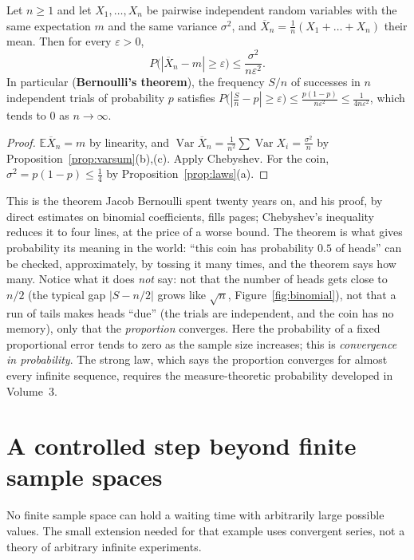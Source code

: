 \begin{theorem}\label{thm:wlln}
Let $n\ge1$ and let $X_1,\dots,X_n$ be pairwise independent random variables with the same expectation $m$ and the same variance $\sigma^2$, and $\overline X_n=\frac1n(X_1+\dots+X_n)$ their mean. Then for every $\varepsilon>0$,
\[
P\big(|\overline X_n-m|\ge\varepsilon\big)\le\frac{\sigma^2}{n\varepsilon^2}.
\]
In particular (\textbf{Bernoulli's theorem}), the frequency $S/n$ of successes in $n$ independent trials of probability $p$ satisfies $P\big(\left|\frac Sn-p\right|\ge\varepsilon\big)\le\frac{p(1-p)}{n\varepsilon^2}\le\frac1{4n\varepsilon^2}$, which tends to $0$ as $n\to\infty$.
\end{theorem}
\begin{proof}
$\mathbb E\overline X_n=m$ by linearity, and $\operatorname{Var}\overline X_n=\frac1{n^2}\sum\operatorname{Var}X_i=\frac{\sigma^2}n$ by Proposition~\ref{prop:varsum}(b),(c). Apply Chebyshev. For the coin, $\sigma^2=p(1-p)\le\frac14$ by Proposition~\ref{prop:laws}(a).
\end{proof}

This is the theorem Jacob Bernoulli spent twenty years on, and his proof, by direct estimates on binomial coefficients, fills pages; Chebyshev's inequality reduces it to four lines, at the price of a worse bound. The theorem is what gives probability its meaning in the world: ``this coin has probability $0.5$ of heads'' can be checked, approximately, by tossing it many times, and the theorem says how many. Notice what it does \emph{not} say: not that the number of heads gets close to $n/2$ (the typical gap $|S-n/2|$ grows like $\sqrt n$, Figure~\ref{fig:binomial}), not that a run of tails makes heads ``due'' (the trials are independent, and the coin has no memory), only that the \emph{proportion} converges. Here the probability of a fixed proportional error tends to zero as the sample size increases; this is \emph{convergence in probability}. The strong law, which says the proportion converges for almost every infinite sequence, requires the measure-theoretic probability developed in Volume~3.

\section{A controlled step beyond finite sample spaces}\label{sec:countable-probability}
No finite sample space can hold a waiting time with arbitrarily large possible
values. The small extension needed for that example uses convergent series,
not a theory of arbitrary infinite experiments.

